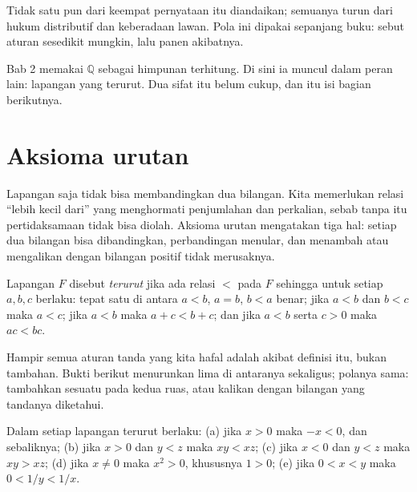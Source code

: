 Tidak satu pun dari keempat pernyataan itu diandaikan; semuanya turun dari hukum
distributif dan keberadaan lawan. Pola ini dipakai sepanjang buku: sebut aturan
sesedikit mungkin, lalu panen akibatnya.


Bab 2 memakai $\mathbb{Q}$ sebagai himpunan terhitung. Di sini ia muncul dalam peran
lain: lapangan yang terurut. Dua sifat itu belum cukup, dan itu isi bagian berikutnya.

\section{Aksioma urutan}

Lapangan saja tidak bisa membandingkan dua bilangan. Kita memerlukan relasi ``lebih
kecil dari'' yang menghormati penjumlahan dan perkalian, sebab tanpa itu pertidaksamaan
tidak bisa diolah. Aksioma urutan mengatakan tiga hal: setiap dua bilangan bisa
dibandingkan, perbandingan menular, dan menambah atau mengalikan dengan bilangan positif
tidak merusaknya.

\begin{definisi}
Lapangan $F$ disebut \emph{terurut} jika ada relasi $<$ pada $F$ sehingga untuk setiap
$a,b,c$ berlaku: tepat satu di antara $a<b$, $a=b$, $b<a$ benar; jika $a<b$ dan $b<c$
maka $a<c$; jika $a<b$ maka $a+c<b+c$; dan jika $a<b$ serta $c>0$ maka $ac<bc$.
\end{definisi}

Hampir semua aturan tanda yang kita hafal adalah akibat definisi itu, bukan tambahan.
Bukti berikut menurunkan lima di antaranya sekaligus; polanya sama: tambahkan sesuatu
pada kedua ruas, atau kalikan dengan bilangan yang tandanya diketahui.

\begin{proposisi}
Dalam setiap lapangan terurut berlaku: (a) jika $x>0$ maka $-x<0$, dan sebaliknya;
(b) jika $x>0$ dan $y<z$ maka $xy<xz$; (c) jika $x<0$ dan $y<z$ maka $xy>xz$;
(d) jika $x\neq 0$ maka $x^2>0$, khususnya $1>0$; (e) jika $0<x<y$ maka
$0<1/y<1/x$.
\end{proposisi}

